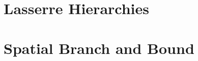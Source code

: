 \documentclass[../main.tex]{subfiles}
\begin{document}


\section{Lasserre Hierarchies}\label{sec:momsos}


\section{Spatial Branch and Bound}\label{sec:sbab}

\end{document}
